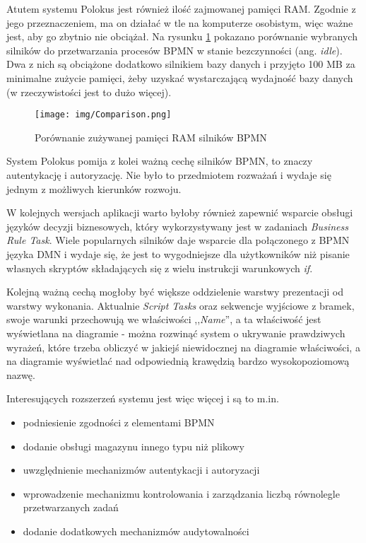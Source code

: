 \documentclass[declaration,shortabstract,mgr]{iithesis}
\newcommand{\bpmn}{BPMN }
\newcommand{\bpmnnospace}{BPMN}
\begin{document}
Atutem systemu Polokus jest również ilość zajmowanej pamięci RAM. Zgodnie z jego przeznaczeniem, ma on działać w tle na komputerze osobistym, więc ważne jest, aby go zbytnio nie obciążał. Na rysunku \ref{fig:comparison} pokazano porównanie wybranych silników do przetwarzania procesów \bpmn w stanie bezczynności (ang. \textit{idle}). Dwa z nich są obciążone dodatkowo silnikiem bazy danych i przyjęto 100 MB za minimalne zużycie pamięci, żeby uzyskać wystarczającą wydajność bazy danych (w rzeczywistości jest to dużo więcej).

\begin{figure}[H]
    \texttt{[image: img/Comparison.png]}
    \caption{Porównanie zużywanej pamięci RAM silników BPMN}
    \label{fig:comparison}
\end{figure}

System Polokus pomija z kolei ważną cechę silników \bpmnnospace, to znaczy autentykację i autoryzację. Nie było to przedmiotem rozważań i wydaje się jednym z możliwych kierunków rozwoju.

W kolejnych wersjach aplikacji warto byłoby również zapewnić wsparcie obsługi języków decyzji biznesowych, który wykorzystywany jest w zadaniach \textit{Business Rule Task}. Wiele popularnych silników daje wsparcie dla połączonego z \bpmn języka DMN i wydaje się, że jest to wygodniejsze dla użytkowników niż pisanie własnych skryptów składających się z wielu instrukcji warunkowych \textit{if}. 

Kolejną ważną cechą mogłoby być większe oddzielenie warstwy prezentacji od warstwy wykonania. Aktualnie \textit{Script Tasks} oraz sekwencje wyjściowe z bramek, swoje warunki przechowują we właściwości ,,\textit{Name}'', a ta właściwość jest wyświetlana na diagramie - można rozwinąć system o ukrywanie prawdziwych wyrażeń, które trzeba obliczyć w jakiejś niewidocznej na diagramie właściwości, a na diagramie wyświetlać nad odpowiednią krawędzią bardzo wysokopoziomową nazwę.

Interesujących rozszerzeń systemu jest więc więcej i są to m.in.

\begin{itemize}
\item podniesienie zgodności z elementami \bpmn
\item dodanie obsługi magazynu innego typu niż plikowy
\item uwzględnienie mechanizmów autentykacji i autoryzacji
\item wprowadzenie mechanizmu kontrolowania i zarządzania liczbą równolegle przetwarzanych zadań
\item dodanie dodatkowych mechanizmów audytowalności
\end{itemize}
\end{document}
